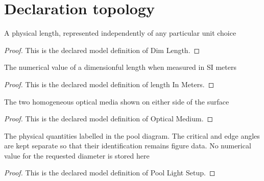 \section{Declaration topology}
\begin{definition}
  \label{def:physics:phyx-mini-0051:phyxminiproblems-problemphyxmini0051-dimlength}
  A physical length, represented independently of any particular unit choice
\end{definition}
\begin{proof}
  This is the declared model definition of Dim Length.
\end{proof}
\begin{definition}
  \label{def:physics:phyx-mini-0051:phyxminiproblems-problemphyxmini0051-lengthinmeters}
  The numerical value of a dimensionful length when measured in SI meters
\end{definition}
\begin{proof}
  This is the declared model definition of length In Meters.
\end{proof}
\begin{definition}
  \label{def:physics:phyx-mini-0051:phyxminiproblems-problemphyxmini0051-opticalmedium}
  The two homogeneous optical media shown on either side of the surface
\end{definition}
\begin{proof}
  This is the declared model definition of Optical Medium.
\end{proof}
\begin{definition}
  \label{def:physics:phyx-mini-0051:phyxminiproblems-problemphyxmini0051-poollightsetup}
  The physical quantities labelled in the pool diagram. The critical and edge angles are kept separate so that their identification remains figure data. No numerical value for the requested diameter is stored here
\end{definition}
\begin{proof}
  This is the declared model definition of Pool Light Setup.
\end{proof}
